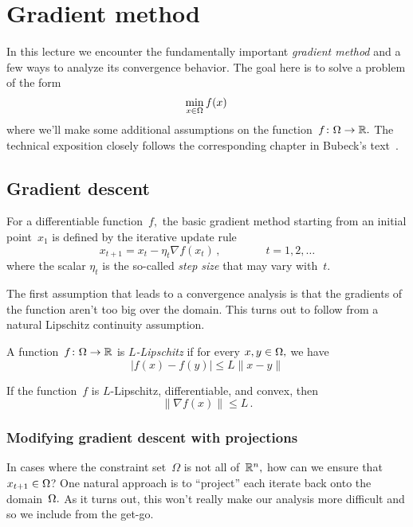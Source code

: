 \section{Gradient method}

In this lecture we encounter the fundamentally important \emph{gradient method}
and a few ways to analyze its convergence behavior.
The goal here is to solve a problem of the form
\[
\min_{x\in\Omega} f(x)\,
\]
where we'll make some additional assumptions on the
function~$f\colon\Omega\to\mathbb{R}.$ The technical exposition closely follows the
corresponding chapter in Bubeck's text~\cite{Bubeck}.

\subsection{Gradient descent}

For a differentiable function~$f,$ the basic gradient method starting from an
initial point~$x_1$ is defined by the iterative update rule
\[
x_{t+1} = x_t - \eta_t \nabla f(x_t)\,,\qquad\qquad t=1,2,\dots
\]
where the scalar $\eta_t$ is the so-called \emph{step size} that may vary with~$t.$

The first assumption that leads to a convergence analysis is that the gradients
of the function aren't too big over the domain. This turns out to follow from a
natural Lipschitz continuity assumption.

\begin{definition}[$L$-Lipschitz]
A function~$f\colon\Omega\to\mathbb{R}$ is \emph{$L$-Lipschitz} if for every
$x,y\in\Omega,$ we have
\[
|f(x) - f(y)| \leq L \|x - y\|
\]
\end{definition}

\begin{fact}
If the function~$f$ is $L$-Lipschitz, differentiable, and convex, then
\[
\|\nabla f(x)\| \leq L\,.
\]
\end{fact}

\subsubsection{Modifying gradient descent with projections}

In cases where the constraint set~$\Omega$ is not all of~$\mathbb{R}^n,$ how can we
ensure that $x_{t+1}\in\Omega$?  One natural approach is to ``project'' each
iterate back onto the domain~$\Omega.$ As it turns out, this won't really make
our analysis more difficult and so we include from the get-go.

